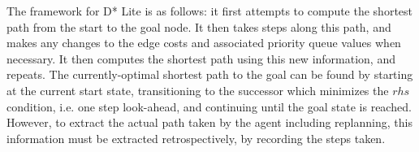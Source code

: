 		The framework for D* Lite is as follows: it first attempts to compute the shortest path from the start to the goal node. It then takes steps along this path, and makes any changes to the edge costs and associated priority queue values when necessary. It then computes the shortest path using this new information, and repeats. The currently-optimal shortest path to the goal can be found by starting at the current start state, transitioning to the successor which minimizes the $rhs$ condition, i.e. one step look-ahead, and continuing until the goal state is reached. However, to extract the actual path taken by the agent including replanning, this information must be extracted retrospectively, by recording the steps taken.